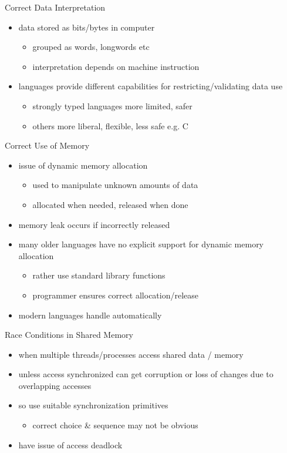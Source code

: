 \documentclass{beamer}
\begin{document}
\begin{frame}{Correct Data Interpretation}
  \begin{itemize}
  \item data stored as bits/bytes in computer
    \begin{itemize}
    \item grouped as words, longwords etc
    \item interpretation depends on machine instruction
    \end{itemize}
  \item languages provide different capabilities for
    restricting/validating data use
  \begin{itemize}
  \item strongly typed languages more limited, safer
  \item others more liberal, flexible, less safe e.g. C 
  \end{itemize}
  \end{itemize}
\end{frame}

\begin{frame}{Correct Use of Memory}
  \begin{itemize}
  \item issue of dynamic memory allocation
    \begin{itemize}
    \item used to manipulate unknown amounts of data
    \item allocated when needed, released when done
    \end{itemize}
\item memory leak occurs if incorrectly released
\item many older languages have no explicit support for
dynamic memory allocation
    \begin{itemize}
    \item rather use standard library functions
    \item programmer ensures correct allocation/release
    \end{itemize}
\item modern languages handle automatically
  \end{itemize}
\end{frame}





\begin{frame}{Race Conditions in Shared Memory}
  \begin{itemize}
  \item when multiple threads/processes access shared
    data / memory
  \item unless access synchronized can get corruption
    or loss of changes due to overlapping accesses
  \item so use suitable synchronization primitives
    \begin{itemize}
    \item correct choice \& sequence may not be obvious
    \end{itemize}
  \item have issue of access deadlock 
  \end{itemize}
\end{frame}
\end{document}
